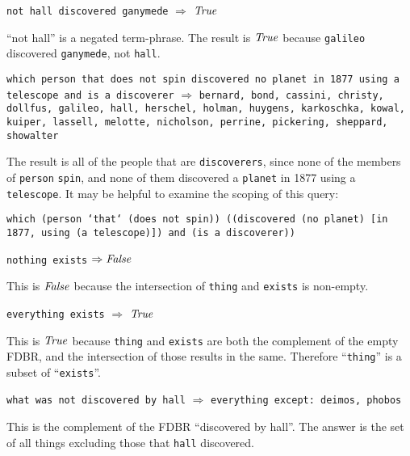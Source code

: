 \documentclass[../main.tex]{subfiles}
\begin{document}
\begin{refsection}
\examplespacing

\texttt{not hall discovered ganymede} $\Rightarrow$ $\operatorname{\mathit{True}}$

\examplespacing

\noindent ``not hall'' is a negated term-phrase.  The result is $\operatorname{\mathit{True}}$ because \texttt{galileo} discovered \texttt{ganymede}, not \texttt{hall}.

\examplespacing

\texttt{which person that does not spin discovered no planet in 1877 using a telescope and is a discoverer} $\Rightarrow$ \texttt{bernard, bond, cassini, christy, dollfus, galileo, hall, herschel, holman, huygens, karkoschka, kowal, kuiper, lassell, melotte, nicholson, perrine, pickering, sheppard, showalter}

\examplespacing

\noindent The result is all of the people that are \texttt{discoverers}, since none of the members of \texttt{person} \texttt{spin}, and none of them discovered a \texttt{planet} in 1877 using a \texttt{telescope}.  It may be helpful to examine the scoping of this query:

\examplespacing

\texttt{which (person `that` (does not spin)) ((discovered (no planet) [in 1877, using (a telescope)]) and (is a discoverer))}

\examplespacing

\texttt{nothing exists} $\Rightarrow \operatorname{\mathit{False}}$

\examplespacing

\noindent This is $\operatorname{\mathit{False}}$ because the intersection of \texttt{thing} and \texttt{exists} is non-empty.

\examplespacing

\texttt{everything exists} $\Rightarrow$ $\operatorname{\mathit{True}}$

\examplespacing

\noindent This is $\operatorname{\mathit{True}}$ because \texttt{thing} and \texttt{exists} are both the complement of the empty FDBR, and the intersection of those results in the same.  Therefore ``\texttt{thing}'' is a subset of ``\texttt{exists}''.

\examplespacing

\texttt{what was not discovered by hall} $\Rightarrow$ \texttt{everything except: deimos, phobos}

\examplespacing

\noindent This is the complement of the FDBR ``discovered by hall''.  The answer is the set of all things excluding those that \texttt{hall} discovered.


\end{refsection}
\end{document}
